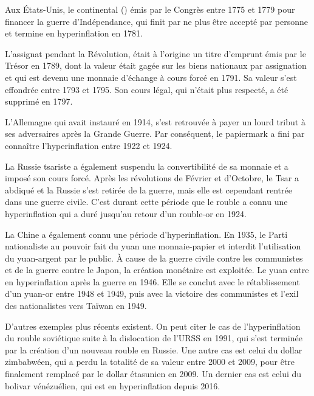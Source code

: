 Aux États-Unis, le continental () émis par le Congrès entre 1775 et 1779 pour financer la guerre d'Indépendance, qui finit par ne plus être accepté par personne et termine en hyperinflation en 1781. %

L'assignat pendant la Révolution, était à l'origine un titre d'emprunt émis par le Trésor en 1789, dont la valeur était gagée sur les biens nationaux par assignation et qui est devenu une monnaie d'échange à cours forcé en 1791. Sa valeur s'est effondrée entre 1793 et 1795. Son cours légal, qui n'était plus respecté, a été supprimé en 1797.

L'Allemagne qui avait instauré  en 1914, s'est retrouvée à payer un lourd tribut à ses adversaires après la Grande Guerre. Par conséquent, le papiermark a fini par connaître l'hyperinflation entre 1922 et 1924.

La Russie tsariste a également suspendu la convertibilité de sa monnaie et a imposé son cours forcé. Après les révolutions de Février et d'Octobre, le Tsar a abdiqué et la Russie s'est retirée de la guerre, mais elle est cependant rentrée dans une guerre civile. C'est durant cette période que le rouble a connu une hyperinflation qui a duré jusqu'au retour d'un rouble-or en 1924.

La Chine a également connu une période d'hyperinflation. En 1935, le Parti nationaliste au pouvoir fait du yuan une monnaie-papier et interdit l'utilisation du yuan-argent par le public. À cause de la guerre civile contre les communistes et de la guerre contre le Japon, la création monétaire est exploitée. Le yuan entre en hyperinflation après la guerre en 1946. Elle se conclut avec le rétablissement d'un yuan-or entre 1948 et 1949, puis avec la victoire des communistes et l'exil des nationalistes vers Taïwan en 1949.

D'autres exemples plus récents existent. On peut citer le cas de l'hyperinflation du rouble soviétique suite à la dislocation de l'URSS en 1991, qui s'est terminée par la création d'un nouveau rouble en Russie. Une autre cas est celui du dollar zimbabwéen, qui a perdu la totalité de sa valeur entre 2000 et 2009, pour être finalement remplacé par le dollar étasunien en 2009. Un dernier cas est celui du bolivar vénézuélien, qui est en hyperinflation depuis 2016.

